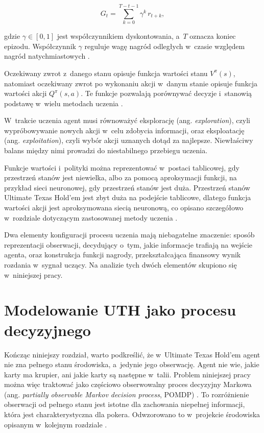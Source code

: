 \begin{equation}
    G_t = \sum_{k=0}^{T-t-1} \gamma^{k}\, r_{t+k},
\end{equation}

gdzie \(\gamma \in [0,1]\) jest współczynnikiem dyskontowania, a~\(T\)
oznacza koniec epizodu. Współczynnik \(\gamma\) reguluje wagę nagród
odległych w~czasie względem nagród natychmiastowych \cite{sutton_barto_rl}.

Oczekiwany zwrot z~danego stanu opisuje funkcja wartości stanu
\(V^{\pi}(s)\), natomiast oczekiwany zwrot po wykonaniu akcji w~danym
stanie opisuje funkcja wartości akcji \(Q^{\pi}(s,a)\). Te funkcje
pozwalają porównywać decyzje i~stanowią podstawę w~wielu metodach uczenia \cite{sutton_barto_rl}.

W~trakcie uczenia agent musi równoważyć eksplorację (ang. \emph{exploration}), czyli wypróbowywanie
nowych akcji w~celu zdobycia informacji, oraz eksploatację (ang. \emph{exploitation}), czyli wybór
akcji uznanych dotąd za najlepsze. Niewłaściwy balans między nimi
prowadzi do niestabilnego
przebiegu uczenia.

Funkcje wartości i~polityki można reprezentować w~postaci tablicowej, gdy
przestrzeń stanów jest niewielka, albo za pomocą aproksymacji funkcji, na
przykład sieci neuronowej, gdy przestrzeń stanów jest duża.
Przestrzeń stanów Ultimate Texas Hold’em jest zbyt duża na podejście
tablicowe, dlatego funkcja wartości akcji jest aproksymowana
siecią neuronową, co opisano szczegółowo w~rozdziale dotyczącym
zastosowanej metody uczenia \cite{sutton_barto_rl}.

Dwa elementy konfiguracji
procesu uczenia mają niebagatelne znaczenie: sposób reprezentacji obserwacji, decydujący o~tym, jakie
informacje trafiają na wejście agenta, oraz konstrukcja funkcji nagrody,
przekształcająca finansowy wynik rozdania w~sygnał uczący. Na analizie tych dwóch elementów
skupiono się w~niniejszej pracy.

\section{Modelowanie UTH jako procesu decyzyjnego}

Kończąc niniejszy rozdział, warto podkreślić, że w~Ultimate Texas
Hold’em agent nie zna pełnego stanu środowiska, a~jedynie jego
obserwację. Agent nie wie, jakie karty ma krupier, ani jakie karty są
następne w~talii. Problem niniejszej pracy można więc traktować jako
częściowo obserwowalny proces decyzyjny Markowa (ang. \emph{partially
observable Markov decision process}, POMDP) \cite{russell_norvig_aima_2020}.
To rozróżnienie obserwacji od
pełnego stanu jest istotne dla zachowania niepełnej informacji, która
jest charakterystyczna dla pokera. Odwzorowano to w~projekcie środowiska
opisanym w~kolejnym rozdziale \cite{sutton_barto_rl}.
